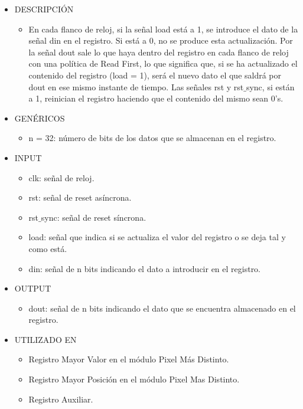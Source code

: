 \begin{itemize}
    \item DESCRIPCIÓN
        \begin{itemize}
            \item En cada flanco de reloj, si la señal load está a 1, se introduce el dato de la señal din en el registro. Si está a 0, no se produce esta actualización. Por la señal dout sale lo que haya dentro del registro en cada flanco de reloj con una política de Read First, lo que significa que, si se ha actualizado el contenido del registro (load = 1), será el nuevo dato el que saldrá por dout en ese mismo instante de tiempo. Las señales rst y rst$\_$sync, si están a 1, reinician el registro haciendo que el contenido del mismo sean 0’s.
        \end{itemize}
    \item GENÉRICOS
        \begin{itemize}
            \item n = 32: número de bits de los datos que se almacenan en el registro.
        \end{itemize}
    \item INPUT
        \begin{itemize}
            \item clk: señal de reloj.
            \item rst: señal de reset asíncrona.
            \item rst$\_$sync: señal de reset síncrona.
            \item load: señal que indica si se actualiza el valor del registro o se deja tal y como está.
            \item din: señal de n bits indicando el dato a introducir en el registro.
        \end{itemize}
    \item OUTPUT
        \begin{itemize}
            \item dout: señal de n bits indicando el dato que se encuentra almacenado en el registro.
        \end{itemize}
    \item UTILIZADO EN
        \begin{itemize}
            \item Registro Mayor Valor en el módulo Pixel Más Distinto.
            \item Registro Mayor Posición en el módulo Pixel Mas Distinto.
            \item Registro Auxiliar.
        \end{itemize}
\end{itemize}

